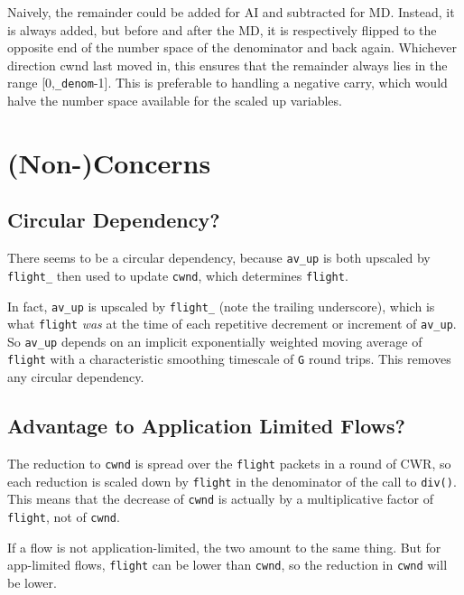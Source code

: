 Naively, the remainder could be added for AI and subtracted for MD. Instead, it
is always added, but before and after the MD, it is respectively flipped to the
opposite end of the number space of the denominator and back again. Whichever
direction cwnd last moved in, this ensures that the remainder always lies in the
range [0,\texttt{\_denom}-1]. This is preferable to handling a negative carry,
which would halve the number space available for the scaled up variables.

\section{(Non-)Concerns}\label{prresp_Non-Concerns}

\subsection{Circular Dependency?}\label{prresp_No_Circular_Dependency}

There seems to be a circular dependency, because \texttt{av\_up} is both
upscaled by \texttt{flight\_} then used to update \texttt{cwnd}, which
determines \texttt{flight}.

In fact, \texttt{av\_up} is upscaled by \texttt{flight\_} (note the trailing
underscore), which is what \texttt{flight} \emph{was} at the time of each
repetitive decrement or increment of \texttt{av\_up}. So \texttt{av\_up} depends
on an implicit exponentially weighted moving average of \texttt{flight} with a
characteristic smoothing timescale of \texttt{G} round trips. This removes any
circular dependency.

\subsection{Advantage to Application Limited
	Flows?}\label{prresp_Advantage_App-Limited}

The reduction to \texttt{cwnd} is spread over the \texttt{flight} packets in a
round of CWR, so each reduction is scaled down by \texttt{flight} in the
denominator of the call to \texttt{div()}. This means that the
decrease of \texttt{cwnd} is actually by a multiplicative factor of
\texttt{flight}, not of \texttt{cwnd}.

If a flow is not application-limited, the two amount to the same thing. But for
app-limited flows, \texttt{flight} can be lower than \texttt{cwnd}, so the
reduction in \texttt{cwnd} will be lower.

